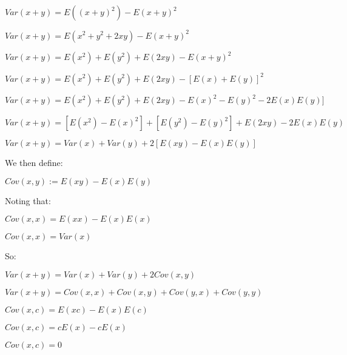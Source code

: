 $Var(x+y)=E((x+y)^2)-E(x+y)^2$

$Var(x+y)=E(x^2+y^2+2xy)-E(x+y)^2$

$Var(x+y)=E(x^2)+E(y^2)+E(2xy)-E(x+y)^2$

$Var(x+y)=E(x^2)+E(y^2)+E(2xy)-[E(x)+E(y)]^2$

$Var(x+y)=E(x^2)+E(y^2)+E(2xy)-E(x)^2-E(y)^2-2E(x)E(y)]$

$Var(x+y)=[E(x^2)-E(x)^2]+[E(y^2)-E(y)^2]+E(2xy)-2E(x)E(y)$

$Var(x+y)=Var(x) +Var(y)+2[E(xy)-E(x)E(y)]$

We then define:

$Cov(x,y):=E(xy)-E(x)E(y)$

Noting that:

$Cov(x,x)=E(xx)-E(x)E(x)$

$Cov(x,x)=Var(x) $

So:

$Var(x+y)=Var(x)+Var(y)+2Cov(x,y)$

$Var(x+y)=Cov(x,x)+Cov(x,y)+Cov(y,x)+Cov(y,y) $

$Cov(x,c)=E(xc)-E(x)E(c)$

$Cov(x,c)=cE(x)-cE(x)$

$Cov(x,c)=0$

